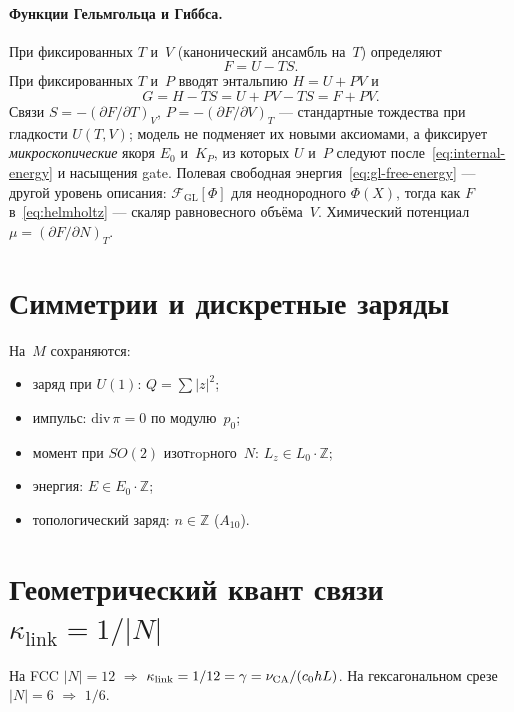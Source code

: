 \paragraph{Функции Гельмгольца и Гиббса.}
При фиксированных $T$ и~$V$ (канонический ансамбль на~$T$) определяют
\begin{equation}
\label{eq:helmholtz}
  F = U - TS.
\end{equation}
При фиксированных $T$ и~$P$ вводят энтальпию $H=U+PV$ и
\begin{equation}
\label{eq:gibbs}
  G = H - TS = U + PV - TS = F + PV.
\end{equation}
Связи $S=-(\partial F/\partial T)_V$, $P=-(\partial F/\partial V)_T$ --- стандартные
тождества при гладкости $U(T,V)$; модель не подменяет их новыми аксиомами,
а фиксирует \emph{микроскопические} якоря $E_0$ и~$K_P$, из которых $U$ и~$P$
следуют после~\eqref{eq:internal-energy} и насыщения gate.
Полевая свободная энергия~\eqref{eq:gl-free-energy} --- другой уровень описания:
$\mathcal{F}_{\mathrm{GL}}[\Phi]$ для неоднородного $\Phi(X)$, тогда как $F$ в~\eqref{eq:helmholtz}
--- скаляр равновесного объёма~$V$.
Химический потенциал $\mu=(\partial F/\partial N)_T$.

\section{Симметрии и дискретные заряды}

\begin{proposition}
На~$M$ сохраняются:
\begin{itemize}
\item заряд при $U(1)$: $Q=\sum|z|^2$;
\item импульс: $\mathrm{div}\,\pi=0$ по модулю~$p_0$;
\item момент при $SO(2)$ изотropного~$N$: $L_z\in L_0\cdot\mathbb{Z}$;
\item энергия: $E\in E_0\cdot\mathbb{Z}$;
\item топологический заряд: $n\in\mathbb{Z}$ ($A_{10}$).
\end{itemize}
\end{proposition}

\section{Геометрический квант связи \texorpdfstring{$\kappa_{\mathrm{link}}=1/|N|$}{kappa=1/|N|}}

\begin{proposition}
На FCC $|N|=12$ $\Rightarrow$ $\kappa_{\mathrm{link}}=1/12=\gamma=\nu_{\mathrm{CA}}/(c_0hL)$.
На гексагональном срезе $|N|=6$ $\Rightarrow$ $1/6$.
\end{proposition}

